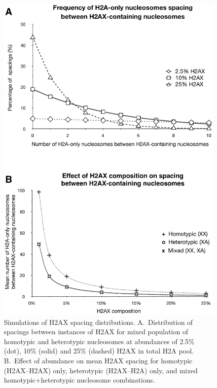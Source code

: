 \documentclass[graybox]{svmult}
\begin{document}
\begin{figure}
\includegraphics{Fig7}
\caption{Simulations of H2AX spacing distributions. A.~Distribution of spacings between instances of
H2AX for mixed population of homotypic and heterotypic nucleosomes at abundances of 2.5\% (dot),
10\% (solid) and 25\% (dashed) H2AX in total H2A pool. B.~Effect of abundance on mean H2AX spacing
for homotypic (H2AX--H2AX) only, heterotypic (H2AX--H2A) only, and mixed homotypic$+$heterotypic
nucleosome combinations.}
\label{fig:H2AX-graphs}
\end{figure}
\end{document}

